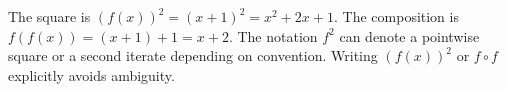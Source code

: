 The square is $(f(x))^2=(x+1)^2=\boxed{x^2+2x+1}$. The composition is $f(f(x))=(x+1)+1=\boxed{x+2}$. The notation $f^2$ can denote a pointwise square or a second iterate depending on convention. Writing $(f(x))^2$ or $f\circ f$ explicitly avoids ambiguity.
